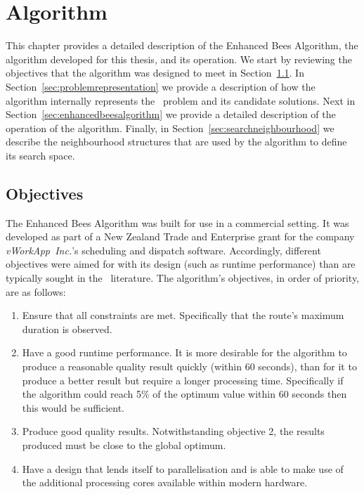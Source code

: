 
\chapter{Algorithm}
\label{chap:algorithm}

This chapter provides a detailed description of the Enhanced Bees Algorithm, the algorithm developed for this thesis, and its operation. We start by reviewing the objectives that the algorithm was designed to meet in Section~\ref{sec:objectives}. In Section~\ref{sec:problemrepresentation} we provide a description of how the algorithm internally represents the \VRP\ problem and its candidate solutions. Next in Section~\ref{sec:enhancedbeesalgorithm} we provide a detailed description of the operation of the algorithm. Finally, in Section~\ref{sec:searchneighbourhood} we describe the neighbourhood structures that are used by the algorithm to define its search space.

\section{Objectives}
\label{sec:objectives}

The Enhanced Bees Algorithm was built for use in a commercial setting. It was developed as part of a New Zealand Trade and Enterprise grant for the company \emph{vWorkApp~Inc.}'s scheduling and dispatch software. Accordingly, different objectives were aimed for with its design (such as runtime performance) than are typically sought in the \VRP\ literature. The algorithm's objectives, in order of priority, are as follows:

\begin{enumerate}
   \item Ensure that all constraints are met. Specifically that the route's maximum duration is observed. 
   
   \item Have a good runtime performance. It is more desirable for the algorithm to produce a reasonable quality result quickly (within 60 seconds), than for it to produce a better result but require a longer processing time. Specifically if the algorithm could reach 5\% of the optimum value within 60 seconds then this would be sufficient. 

   \item Produce good quality results. Notwithstanding objective 2, the results produced must be close to the global optimum. 
   
   \item Have a design that lends itself to parallelisation and is able to make use of the additional processing cores available within modern hardware.
   
\end{enumerate}

